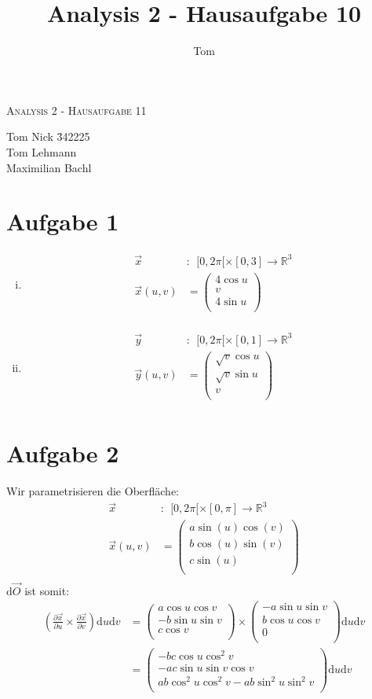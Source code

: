 \documentclass[10pt,a4paper,parskip=half]{scrartcl}
\author{Tom}
\title{Analysis 2 - Hausaufgabe 10}
\newcommand{\vecthree}[3]{\begin{pmatrix}#1\\#2\\#3\\\end {pmatrix}}
\begin{document}
\begin{center}
\textsc{\Large{Analysis 2 - Hausaufgabe 11}} \\
\end{center}
\begin{tabbing}
Tom Nick \hspace{1.4cm}\= 342225\\
Tom Lehmann\\
Maximilian Bachl
\end{tabbing}
\section*{Aufgabe 1}
\begin{enumerate}[(i)]
\item
\begin{align*}
\vec x&:~~ [0,2\pi[ \times [0,3] \to \mathbb{R}^3\\
\vec x(u,v) &= \vecthree{4\cos u}{v}{4\sin u} \\
\end{align*}
\item
\begin{align*}
\vec y&:~~ [0,2\pi[ \times [0,1] \to \mathbb{R}^3\\
\vec y(u,v) &= \vecthree{\sqrt v\cos u}{\sqrt v\sin u}{v} \\
\end{align*}
\end{enumerate}
\section*{Aufgabe 2}
Wir parametrisieren die Oberfläche:
\begin{align*}
\vec x&:~~ [0,2\pi[ \times [0,\pi] \to \mathbb{R}^3\\
\vec x(u,v) &= \vecthree{a\sin(u) \cos(v)}{b\cos(u)\sin(v)}{c \sin(u)} \\
\end{align*}
$\mathrm d \vec O$ ist somit:
\begin{align*}
\left(\frac{\partial \vec x}{\partial u} \times \frac{\partial \vec x}{\partial v}\right) \mathrm d u \mathrm d v &= \vecthree{a \cos u \cos v}{-b \sin u \sin v}{c \cos v} \times \vecthree{-a \sin u \sin v}{b \cos u \cos v}{0} \mathrm d u \mathrm d v\\
&= \vecthree{-bc \cos u \cos^2 v}{-ac \sin u \sin v \cos v}{ab \cos^2 u \cos^2 v - ab \sin^2 u \sin^2 v} \mathrm d u \mathrm d v\\
\end{align*}
\end{document}
